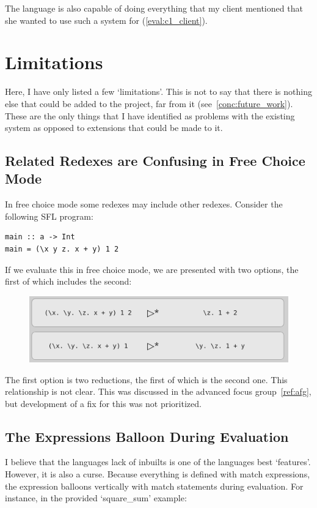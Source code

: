 \noindent The language is also capable of doing everything that my client mentioned that she wanted to use such a system for (\ref{eval:c1_client}).


\section{Limitations}
Here, I have only listed a few `limitations'. This is not to say that there is nothing else that could be added to the project, far from it (see~\ref{conc:future_work}). These are the only things that I have identified as problems with the existing system as opposed to extensions that could be made to it. 

\subsection{Related Redexes are Confusing in Free Choice Mode}
In free choice mode some redexes may include other redexes. Consider the following \ac{SFL} program:

\begin{lstlisting}[language=SFL]
main :: a -> Int 
main = (\x y z. x + y) 1 2
\end{lstlisting}

\noindent If we evaluate this in free choice mode, we are presented with two options, the first of which includes the second:

\begin{figure}[!h]
    \centering
    \includegraphics[width=0.75\linewidth]{images/conc_add.png}
\end{figure}

\noindent The first option is two reductions, the first of which is the second one. This relationship is not clear. This was discussed in the advanced focus group~\ref{ref:afg}, but development of a fix for this was not prioritized. 

\subsection{The Expressions Balloon During Evaluation}
\label{conc:baboon}
I believe that the languages lack of inbuilts is one of the languages best `features'. However, it is also a curse. Because everything is defined with match expressions, the expression balloons vertically with match statements during evaluation. For instance, in the provided `square\_sum' example:

